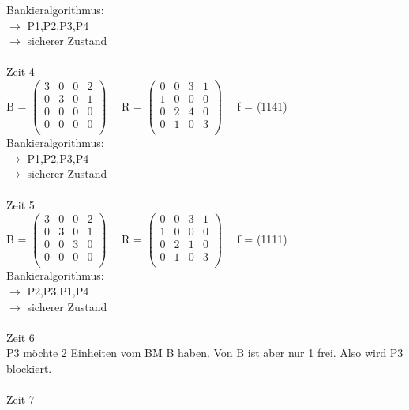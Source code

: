 \documentclass[10pt,a4paper]{scrartcl}
\begin{document}
	Bankieralgorithmus:\\
	$\rightarrow$ P1,P2,P3,P4\\
	$\rightarrow$ sicherer Zustand
	\\\\Zeit 4\\
	B =
	$\left( \begin{array}{rrrr}
	3 & 0 & 0 & 2 \\
	0 & 3 & 0 & 1 \\
	0 & 0 & 0 & 0 \\
	0 & 0 & 0 & 0 \\
	\end{array}\right) $
	\ \ R =
	$\left( \begin{array}{rrrr}
	0 & 0 & 3 & 1 \\
	1 & 0 & 0 & 0 \\
	0 & 2 & 4 & 0 \\
	0 & 1 & 0 & 3 \\
	\end{array}\right) $ 
	\ \ f = (1141)\\
	Bankieralgorithmus:\\
	$\rightarrow$ P1,P2,P3,P4\\
	$\rightarrow$ sicherer Zustand
	\\\\Zeit 5\\
	B =
	$\left( \begin{array}{rrrr}
	3 & 0 & 0 & 2 \\
	0 & 3 & 0 & 1 \\
	0 & 0 & 3 & 0 \\
	0 & 0 & 0 & 0 \\
	\end{array}\right) $
	\ \ R =
	$\left( \begin{array}{rrrr}
	0 & 0 & 3 & 1 \\
	1 & 0 & 0 & 0 \\
	0 & 2 & 1 & 0 \\
	0 & 1 & 0 & 3 \\
	\end{array}\right) $ 
	\ \ f = (1111)\\
	Bankieralgorithmus:\\
	$\rightarrow$ P2,P3,P1,P4\\
	$\rightarrow$ sicherer Zustand
	\\\\Zeit 6\\
	P3 möchte 2 Einheiten vom BM B haben. Von B ist aber nur 1 frei. Also wird P3 blockiert.
	\\\\Zeit 7\\
\end{document}
